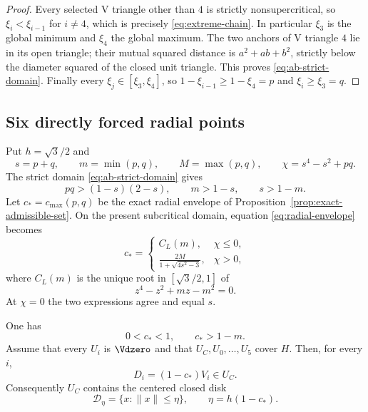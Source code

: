 \begin{proof}
Every selected V triangle other than $4$ is strictly nonsupercritical, so
$\xi_i<\xi_{i-1}$ for $i\ne4$, which is precisely
\eqref{eq:extreme-chain}.  In particular $\xi_3$ is the global minimum and
$\xi_4$ the global maximum.  The two anchors of V triangle $4$ lie in its open triangle;
their mutual squared distance is $a^2+ab+b^2$, strictly below the diameter
squared of the closed unit triangle.  This proves \eqref{eq:ab-strict-domain}.
Finally every $\xi_j\in[\xi_3,\xi_4]$, so
$1-\xi_{i-1}\ge1-\xi_4=p$ and $\xi_i\ge \xi_3=q$.
\end{proof}

\subsection{Six directly forced radial points}

Put $h=\sqrt3/2$ and
\[
 s=p+q,\qquad m=\min(p,q),\qquad M=\max(p,q),
 \qquad \chi=s^4-s^2+pq.
\]
The strict domain \eqref{eq:ab-strict-domain} gives
\begin{equation}
 pq>(1-s)(2-s),\qquad m>1-s,\qquad s>1-m.         \label{eq:pq-domain}
\end{equation}
Let $c_*=c_{\max}(p,q)$ be the exact radial envelope of
Proposition~\ref{prop:exact-admissible-set}.  On the present subcritical
domain, equation \eqref{eq:radial-envelope} becomes
\begin{equation}
 c_*=\begin{cases}
 C_L(m),&\chi\le0,\\[1mm]
 \displaystyle\frac{2M}{1+\sqrt{4s^2-3}},&\chi>0,
 \end{cases}                                    \label{eq:core-cstar}
\end{equation}
where $C_L(m)$ is the unique root in $[\sqrt3/2,1]$ of
\[
 z^4-z^2+mz-m^2=0.
\]
At $\chi=0$ the two expressions agree and equal $s$.

\begin{lemma}
\label{lem:symmetric-core-witness}
One has
\begin{equation}
 0<c_*<1,\qquad c_*>1-m.                         \label{eq:cstar-bounds}
\end{equation}
Assume that every $U_i$ is $\Vdzero$ and that
$U_C,U_0,\ldots,U_5$ cover $H$.  Then, for every $i$,
\[
 D_i=(1-c_*)V_i\in U_C.
\]
Consequently $U_C$ contains the centered closed disk
\begin{equation}
 \mathcal D_\eta=\{x:\lVert x\rVert\le\eta\},
 \qquad \eta=h(1-c_*).                           \label{eq:forced-disk}
\end{equation}
\end{lemma}

